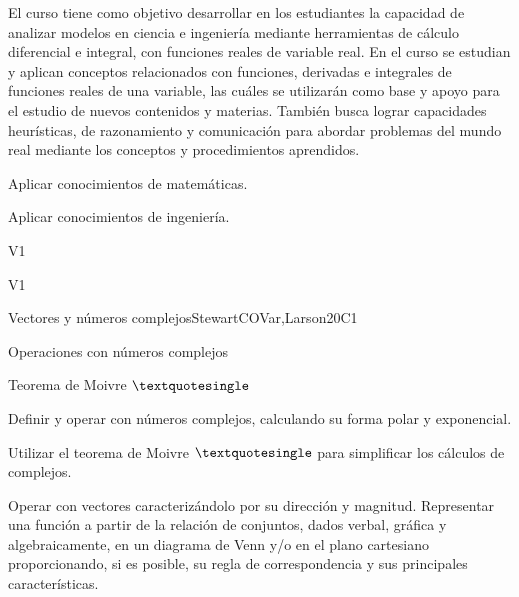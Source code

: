 \begin{syllabus}


\begin{justification}
El curso tiene como objetivo desarrollar en los estudiantes la capacidad de analizar modelos en ciencia e ingeniería mediante herramientas de cálculo
diferencial e integral, con funciones reales de variable real.
En el curso se estudian y aplican conceptos relacionados con funciones, derivadas e integrales de funciones reales de una variable, las cuáles se utilizarán como base y apoyo para el estudio de nuevos contenidos y materias.
También busca lograr capacidades heurísticas, de razonamiento y comunicación para abordar problemas del mundo real mediante los conceptos y procedimientos aprendidos.
\end{justification}

\begin{goals}
\item Aplicar conocimientos de matemáticas.
\item Aplicar conocimientos de ingeniería.
\end{goals}

\begin{outcomes}{V1}
   \item {}
   \item {}
\end{outcomes}

\begin{competences}{V1}
   \item {}
   \item {}
   \item {}
\end{competences}

\begin{unit}{Vectores y números complejos}{}{StewartCOVar,Larson}{20}{C1}
   \begin{topics}
      \item Operaciones con números complejos
      \item Teorema de Moivre $\textquotesingle$
   \end{topics}

   \begin{learningoutcomes}
      \item Definir y operar con números complejos, calculando su forma polar y exponencial.
      \item Utilizar el teorema de Moivre $\textquotesingle$ para simplificar los cálculos de complejos.
      \item Operar con vectores caracterizándolo por su dirección y magnitud.  Representar una función a partir de la relación de conjuntos,  dados verbal, gráfica y algebraicamente,  en un diagrama de Venn  y/o en el plano cartesiano proporcionando, si es posible, su regla de correspondencia  y sus principales características.
   \end{learningoutcomes}
\end{unit}


\end{syllabus}
